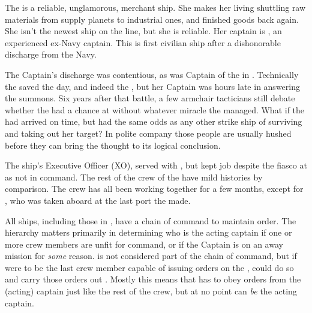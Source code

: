 \documentclass[blue]{TMFHope}
\begin{document}
\name{\bHope{}}

The \pNew{} is a reliable, unglamorous, merchant ship. She makes her living shuttling raw materials from supply planets to industrial ones, and finished goods back again. She isn't the newest ship on the line, but she is reliable. Her captain is \cCap{\full}, an experienced ex-Navy captain. This is \cCap{\their} first civilian ship after a dishonorable discharge from the Navy.  

The Captain's discharge was contentious, as \cCap{} was Captain of the \pOld{} in \pBattle{}. Technically the \pOld{} saved the day, and indeed the \pPlan{}, but her Captain was hours late in answering the summons. Six years after that battle, a few armchair tacticians still debate whether the \pPlan{} had a chance at \pHome{} without whatever miracle the \pOld{} managed. What if the \pOld{} had arrived on time, but had the same odds as any other strike ship of surviving and taking out her target? In polite company those people are usually hushed before they can bring the thought to its logical conclusion.

The ship's Executive Officer (XO), \cXO{} served with \cCap{}, but kept \cXO{\their} job despite the fiasco at \pBattle{} as \cXO{\they} \cXO{\were} not in command. The rest of the crew of the \pNew{} have mild histories by comparison. The crew has all been working together for a few months, except for \cBoy{}, who was taken aboard at the last port the \pNew{} made. 

All ships, including those in \pTMF{}, have a chain of command to maintain order. The hierarchy matters primarily in determining who is the acting captain if one or more crew members are unfit for command, or if the Captain is on an away mission for \emph{some} reason. \cBoy{} is not considered part of the chain of command, but if \cBoy{\they} were to be the last crew member capable of issuing orders on the \pNew{}, \cBoy{\they} could do so and carry those orders out \cBoy{\themself}. Mostly this means that \cBoy{} has to obey orders from the (acting) captain just like the rest of the crew, but at no point can \cBoy{} \emph{be} the acting captain.
\end{document}

